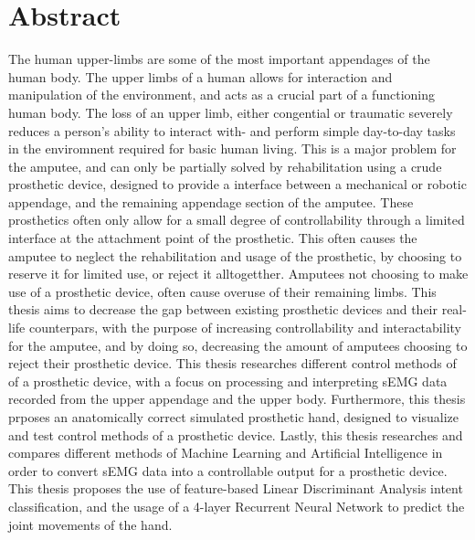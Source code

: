 \documentclass[../main.tex]{subfiles}
\begin{document}
\section*{Abstract}

The human upper-limbs are some of the most important appendages of the human body.
The upper limbs of a human allows for interaction and manipulation of the environment, and acts as a crucial part of a functioning human body.
The loss of an upper limb, either congential or traumatic severely reduces a person's ability to interact with- and perform simple day-to-day tasks in the enviromnent required for basic human living.
This is a major problem for the amputee, and can only be partially solved by rehabilitation using a crude prosthetic device, designed to provide a interface between a mechanical or robotic appendage, and the remaining appendage section of the amputee.
These prosthetics often only allow for a small degree of controllability through a limited interface at the attachment point of the prosthetic.
This often causes the amputee to neglect the rehabilitation and usage of the prosthetic, by choosing to reserve it for limited use, or reject it alltogetther.
Amputees not choosing to make use of a prosthetic device, often cause overuse of their remaining limbs.
This thesis aims to decrease the gap between existing prosthetic devices and their real-life counterpars, with the purpose of increasing controllability and interactability for the amputee, and by doing so, decreasing the amount of amputees choosing to reject their prosthetic device. 
This thesis researches different control methods of of a prosthetic device, with a focus on processing and interpreting sEMG data recorded from the upper appendage and the upper body.
Furthermore, this thesis prposes an anatomically correct simulated prosthetic hand, designed to visualize and test control methods of a prosthetic device.
Lastly, this thesis researches and compares different methods of Machine Learning and Artificial Intelligence in order to convert sEMG data into a controllable output for a prosthetic device.
This thesis proposes the use of feature-based Linear Discriminant Analysis intent classification, and the usage of a 4-layer Recurrent Neural Network to predict the joint movements of the hand.
\end{document}
